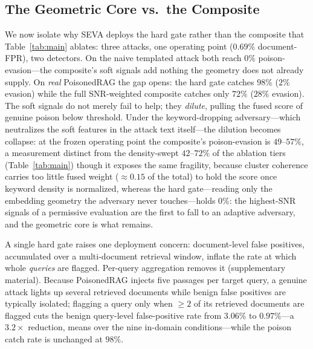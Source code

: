 \documentclass[10pt,journal,compsoc]{IEEEtran}
\begin{document}
\subsection{The Geometric Core vs.\ the Composite}
\label{subsec:core}
We now isolate why SEVA deploys the hard gate rather than the
composite that Table~\ref{tab:main} ablates: three attacks, one operating point
($0.69\%$ document-FPR), two detectors. On the naive templated attack both reach
$0\%$ poison-evasion---the composite's soft signals add nothing the geometry does not
already supply. On \emph{real} PoisonedRAG the gap opens: the hard gate catches $98\%$
($2\%$ evasion) while the full SNR-weighted composite catches only $72\%$ ($28\%$ evasion).
The soft signals do not merely fail to help; they \emph{dilute}, pulling the fused
score of genuine poison below threshold.
Under the keyword-dropping adversary---which neutralizes the soft features in the attack
text itself---the dilution becomes collapse: at the frozen operating point the composite's
poison-evasion is $49$--$57\%$, a measurement distinct from the
density-swept $42$--$72\%$ of the ablation tiers (Table~\ref{tab:main}) though it exposes the
same fragility, because cluster coherence carries too little fused weight
($\approx\!0.15$ of the total) to hold the score once keyword density is normalized,
whereas the hard gate---reading only the embedding geometry the adversary never
touches---holds $0\%$: the highest-SNR signals of a permissive evaluation are the
first to fall to an adaptive adversary, and the geometric core is what remains.

A single hard gate raises one deployment concern: document-level false positives,
accumulated over a multi-document retrieval window, inflate the rate at which whole
\emph{queries} are flagged. Per-query aggregation removes it (supplementary material).
Because PoisonedRAG injects five passages per target query, a genuine
attack lights up several retrieved documents while benign false positives are
typically isolated; flagging a query only when $\geq\!2$ of its retrieved documents
are flagged cuts the benign query-level false-positive rate from $3.06\%$ to
$0.97\%$---a $3.2\times$ reduction, means over the nine in-domain conditions---while the
poison catch rate is unchanged at $98\%$.
\end{document}
